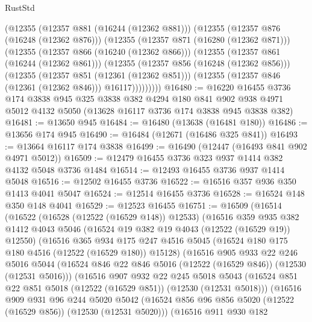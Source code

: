 \begin{lexlean}{RustStd}
\begin{coremodule}
      (@12355
        (@12357 @881 (@16244 (@12362 @881)))
        (@12355
          (@12357 @876 (@16248 (@12362 @876)))
          (@12355
            (@12357 @871 (@16280 (@12362 @871)))
            (@12355
              (@12357 @866 (@16240 (@12362 @866)))
              (@12355
                (@12357 @861 (@16244 (@12362 @861)))
                (@12355
                  (@12357 @856 (@16248 (@12362 @856)))
                  (@12355
                    (@12357 @851 (@12361 (@12362 @851)))
                    (@12355 (@12357 @846 (@12361 (@12362 @846))) @16117)))))))))
@16480 := @16220
    @16455
    @3736
    @174
    @3838
    @945
    @325
    @3838
    @382
    @4294
    @180
    @841
    @902
    @938
    @4971
    @5012
    @4132
    @5050
    (@13628 @16117 @3736 @174 @3838 @945 @3838 @382)
@16481 := @13650 @945
@16484 := @16480 (@13638 (@16481 @180))
@16486 := @13656 @174 @945
@16490 := @16484 (@12671 (@16486 @325 @841))
@16493 := @13664 @16117 @174 @3838
@16499 := @16490 (@12447 (@16493 @841 @902 @4971 @5012))
@16509 := @12479 @16455 @3736 @323 @937 @1414 @382 @4132 @5048 @3736 @1484
@16514 := @12493 @16455 @3736 @937 @1414 @5048
@16516 := @12502 @16455 @3736
@16522 := @16516 @357 @936 @350 @1413 @4041 @5047
@16524 := @12514 @16455 @3736
@16528 := @16524 @148 @350 @148 @4041
@16529 := @12523 @16455
@16751 := @16509
    (@16514
      (@16522
        (@16528 (@12522 (@16529 @148)) @12533)
        (@16516
          @359
          @935
          @382
          @1412
          @4043
          @5046
          (@16524 @19 @382 @19 @4043 (@12522 (@16529 @19)) @12550)
          (@16516
            @365
            @934
            @175
            @247
            @4516
            @5045
            (@16524 @180 @175 @180 @4516 (@12522 (@16529 @180)) @15128)
            (@16516
              @905
              @933
              @22
              @246
              @5016
              @5044
              (@16524 @846 @22 @846 @5016 (@12522 (@16529 @846)) (@12530 (@12531 @5016)))
              (@16516
                @907
                @932
                @22
                @245
                @5018
                @5043
                (@16524 @851 @22 @851 @5018 (@12522 (@16529 @851)) (@12530 (@12531 @5018)))
                (@16516
                  @909
                  @931
                  @96
                  @244
                  @5020
                  @5042
                  (@16524 @856 @96 @856 @5020 (@12522 (@16529 @856)) (@12530 (@12531 @5020)))
                  (@16516
                    @911
                    @930
                    @182

\end{coremodule}
\end{lexlean}
